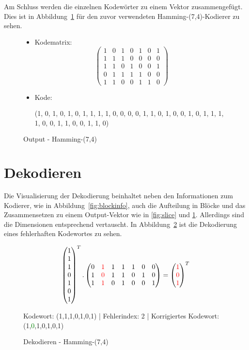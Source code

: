 Am Schluss werden die einzelnen Kodewörter zu einem Vektor zusammengefügt. Dies ist in Abbildung~\ref{fig:output_encoded} für den zuvor verwendeten Hamming-(7,4)-Kodierer zu sehen.
\vspace{1cm}
\begin{figure}[!h]
\begin{itemize}
\itemsep1pt\parskip0pt
\item
  Kodematrix:
  \[\begin{pmatrix}1&0&1&0&1&0&1\\1&1&1&0&0&0&0\\1&1&0&1&0&0&1\\0&1&1&1&1&0&0\\1&1&0&0&1&1&0\end{pmatrix}\]
\item
  Kode:

  \begin{center}(1, 0, 1, 0, 1, 0, 1, 1, 1, 1, 0, 0, 0, 0, 1, 1, 0, 1, 0, 0, 1, 0, 1, 1, 1, 1, 0, 0, 1, 1, 0, 0, 1, 1, 0)\end{center}
\end{itemize}
\caption{Output - Hamming-(7,4)}
\label{fig:output_encoded}
\end{figure}

\section{Dekodieren}

Die Visualisierung der Dekodierung beinhaltet neben den Informationen zum Kodierer, wie in Abbildung~\ref{fig:blockinfo}, auch die Aufteilung in Blöcke und das Zusammensetzen zu einem Output-Vektor wie in \ref{fig:slice} und \ref{fig:output_encoded}. Allerdings sind die Dimensionen entsprechend vertauscht. In Abbildung~\ref{fig:dec_hamming} ist die Dekodierung eines fehlerhaften Kodewortes zu sehen. 

\begin{figure}[!h]
\[\begin{pmatrix}1\\1\\1\\0\\1\\0\\1\\ \end{pmatrix}^T. \begin{pmatrix}0&\textcolor{red}{1}&1&1&1&0&0\\1&\textcolor{red}{0}&1&1&0&1&0\\1&\textcolor{red}{1}&0&1&0&0&1\end{pmatrix} = \begin{pmatrix}\textcolor{red}{1}\\\textcolor{red}{0}\\\textcolor{red}{1}\\ \end{pmatrix}^T\]

Kodewort: (1,1,1,0,1,0,1) | 
Fehlerindex: 2 | 
Korrigiertes Kodewort: (1,\textcolor{green}{0},1,0,1,0,1)
\caption{Dekodieren - Hamming-(7,4)}
\label{fig:dec_hamming}
\end{figure}

